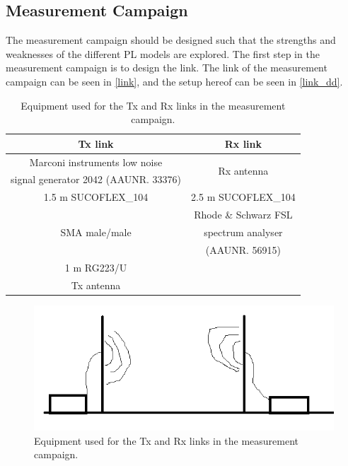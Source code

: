 
\subsection{Measurement Campaign}


The measurement campaign should be designed such that the strengths and weaknesses of the different PL models are explored. 
The first step in the measurement campaign is to design the link. The link of the measurement campaign can be seen in \autoref{link}, and the setup hereof can be seen in \autoref{link_dd}. 

\begin{table}[!htbp]
\centering
\caption{Equipment used for the Tx and Rx links in the measurement campaign.}
\begin{tabular}{|c|c|}\hline
\textbf{Tx link}&\textbf{Rx link}\\\hline
Marconi instruments low noise & \multirow{2}{*}{Rx antenna} \\
signal generator 2042 (AAUNR. 33376) & \\\hline
1.5 m SUCOFLEX\_104 & 2.5 m SUCOFLEX\_104 \\\hline 
\multirow{3}{*}{SMA male/male} & Rhode \& Schwarz FSL \\
&spectrum analyser \\
& (AAUNR. 56915)\\\hline
1 m RG223/U & \\\hline
Tx antenna &\\\hline
\end{tabular}

\label{link}
\end{table}

\begin{figure}[!htbp]
\centering 
\includegraphics[scale=0.5]{figures/setup.png} 
\caption{Equipment used for the Tx and Rx links in the measurement campaign.}
\label{link_dd}
\end{figure}



